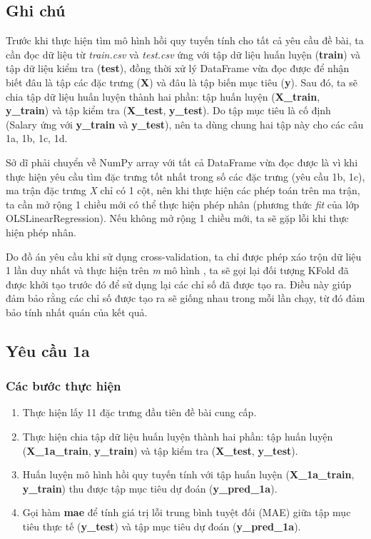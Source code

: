 \documentclass[]{article}
\begin{document}
\subsection{Ghi chú}
Trước khi thực hiện tìm mô hình hồi quy tuyến tính cho tất cả yêu cầu đề bài, ta cần đọc dữ liệu từ \textit{train.csv} và \textit{test.csv} ứng với tập dữ liệu huấn luyện (\textbf{train}) và tập dữ liệu kiểm tra (\textbf{test}), đồng thời xử lý DataFrame vừa đọc được để nhận biết đâu là tập các đặc trưng (\textbf{X}) và đâu là tập biến mục tiêu (\textbf{y}). Sau đó, ta sẽ chia tập dữ liệu huấn luyện thành hai phần: tập huấn luyện (\textbf{X\_train}, \textbf{y\_train}) và tập kiểm tra (\textbf{X\_test}, \textbf{y\_test}). Do tập mục tiêu là cố định (Salary ứng với \textbf{y\_train} và \textbf{y\_test}), nên ta dùng chung hai tập này cho các câu 1a, 1b, 1c, 1d. 

Sở dĩ phải chuyển về NumPy array với tất cả DataFrame vừa đọc được là vì khi thực hiện yêu cầu tìm đặc trưng tốt nhất trong số các đặc trưng (yêu cầu 1b, 1c), ma trận đặc trưng \textit{X} chỉ có 1 cột, nên khi thực hiện các phép toán trên ma trận, ta cần mở rộng 1 chiều mới có thể thực hiện phép nhân (phương thức \textit{fit} của lớp OLSLinearRegression). Nếu không mở rộng 1 chiều mới, ta sẽ gặp lỗi khi thực hiện phép nhân.

Do đồ án yêu cầu khi sử dụng cross-validation, ta chỉ được phép xáo trộn dữ liệu 1 lần duy nhất và thực hiện trên \textit{m} mô hình \cite{hcmusLearningManagement}, ta sẽ gọi lại đối tượng KFold đã được khởi tạo trước đó để sử dụng lại các chỉ số đã được tạo ra. Điều này giúp đảm bảo rằng các chỉ số được tạo ra sẽ giống nhau trong mỗi lần chạy, từ đó đảm bảo tính nhất quán của kết quả.

\subsection{Yêu cầu 1a}
\subsubsection{Các bước thực hiện}
\begin{enumerate}
  \item Thực hiện lấy 11 đặc trưng đầu tiên đề bài cung cấp.
  \item Thực hiện chia tập dữ liệu huấn luyện thành hai phần: tập huấn luyện (\textbf{X\_1a\_train}, \textbf{y\_train}) và tập kiểm tra (\textbf{X\_test}, \textbf{y\_test}).
  \item Huấn luyện mô hình hồi quy tuyến tính với tập huấn luyện (\textbf{X\_1a\_train}, \textbf{y\_train}) thu được tập mục tiêu dự đoán (\textbf{y\_pred\_1a}).
  \item Gọi hàm \textbf{mae} để tính giá trị lỗi trung bình tuyệt đối (MAE) giữa tập mục tiêu thực tế (\textbf{y\_test}) và tập mục tiêu dự đoán (\textbf{y\_pred\_1a}).
\end{enumerate}
\end{document}
